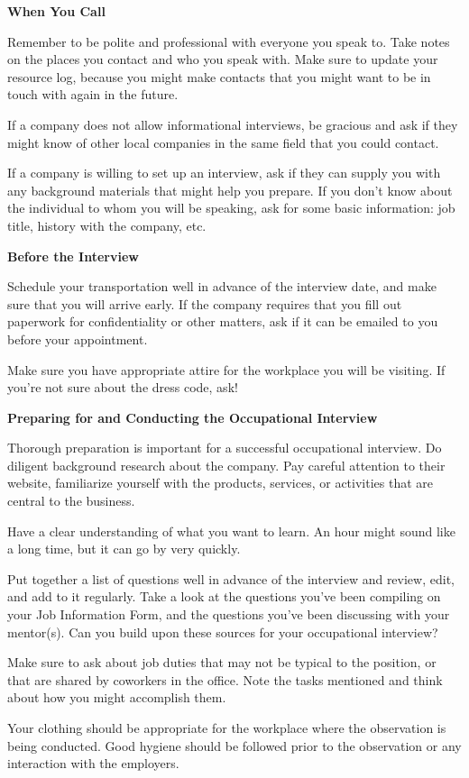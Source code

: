 \textbf{When You Call}

Remember to be polite and professional with everyone you speak to.
Take notes on the places you contact and who you speak with. Make sure to update your resource log, because you might make contacts that you might want to be in touch with again in the future.

If a company does not allow informational interviews, be gracious and ask if they might know of other local companies in the same field that you could contact.

If a company is willing to set up an interview, ask if they can supply you with any background materials that might help you prepare. If you don't know about the individual to whom you will be speaking, ask for some basic information: job title, history with the company, etc.

\textbf{Before the Interview}

Schedule your transportation well in advance of the interview date, and make sure that you will arrive early. If the company requires that you fill out paperwork for confidentiality or other matters, ask if it can be emailed to you before your appointment.

Make sure you have appropriate attire for the workplace you will be visiting. If you're not sure about the dress code, ask!

\textbf{Preparing for and Conducting the Occupational Interview}

Thorough preparation is important for a successful occupational interview. Do diligent background research about the company. Pay careful attention to their website, familiarize yourself with the products, services, or activities that are central to the business.

Have a clear understanding of what you want to learn. An hour might sound like a long time, but it can go by very quickly.

Put together a list of questions well in advance of the interview and review, edit, and add to it regularly. Take a look at the questions you've been compiling on your Job Information Form, and the questions you've been discussing with your mentor(s). Can you build upon these sources for your occupational interview?

Make sure to ask about job duties that may not be typical to the position, or that are shared by coworkers in the office. Note the tasks mentioned and think about how you might accomplish them.

Your clothing should be appropriate for the workplace where the observation is being conducted. Good hygiene should be followed prior to the observation or any interaction with the employers.

